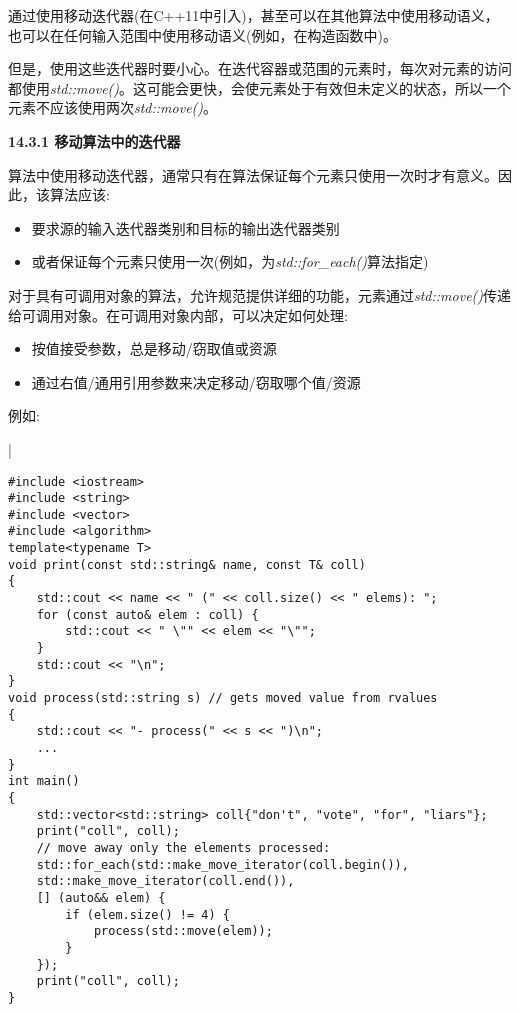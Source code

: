 通过使用移动迭代器(在C++11中引入)，甚至可以在其他算法中使用移动语义，也可以在任何输入范围中使用移动语义(例如，在构造函数中)。\par

但是，使用这些迭代器时要小心。在迭代容器或范围的元素时，每次对元素的访问都使用\textit{std::move()}。这可能会更快，会使元素处于有效但未定义的状态，所以一个元素不应该使用两次\textit{std::move()}。\par

\hspace*{\fill} \par %
\textbf{14.3.1 移动算法中的迭代器}

算法中使用移动迭代器，通常只有在算法保证每个元素只使用一次时才有意义。因此，该算法应该:\par

\begin{itemize}
	\item 要求源的输入迭代器类别和目标的输出迭代器类别
	\item 或者保证每个元素只使用一次(例如，为\textit{std::for\_each()}算法指定)
\end{itemize}

对于具有可调用对象的算法，允许规范提供详细的功能，元素通过\textit{std::move()}传递给可调用对象。在可调用对象内部，可以决定如何处理:\par

\begin{itemize}
	\item 按值接受参数，总是移动/窃取值或资源
	\item 通过右值/通用引用参数来决定移动/窃取哪个值/资源
\end{itemize}

例如:\par

{\color{red}{lib/foreachmove.cpp}}|\par

\begin{lstlisting}[caption={}]
#include <iostream>
#include <string>
#include <vector>
#include <algorithm>
template<typename T>
void print(const std::string& name, const T& coll)
{
	std::cout << name << " (" << coll.size() << " elems): ";
	for (const auto& elem : coll) {
		std::cout << " \"" << elem << "\"";
	}
	std::cout << "\n";
}
void process(std::string s) // gets moved value from rvalues
{
	std::cout << "- process(" << s << ")\n";
	...
}
int main()
{
	std::vector<std::string> coll{"don't", "vote", "for", "liars"};
	print("coll", coll);
	// move away only the elements processed:
	std::for_each(std::make_move_iterator(coll.begin()),
	std::make_move_iterator(coll.end()),
	[] (auto&& elem) {
		if (elem.size() != 4) {
			process(std::move(elem));
		}
	});
	print("coll", coll);
}
\end{lstlisting}

